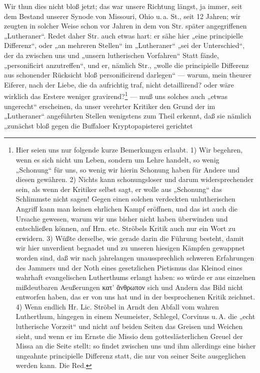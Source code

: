 Wir thun dies nicht bloß jetzt; das war unsere Richtung längst, ja immer, seit dem Bestand unserer
Synode von Missouri, Ohio u.\,a. St., seit 12 Jahren; wir zeugten in solcher Weise schon vor Jahren in dem
von Str. später angegriffenen „Lutheraner“. Redet daher Str. auch etwas hart: er sähe hier „eine
principielle Differenz“, oder „an mehreren Stellen“ im „Lutheraner“ „sei der Unterschied“,
der da zwischen uns und „unsern lutherischen Vorfahren“ Statt fände, „personificirt anzutreffen“,
und er, nämlich Str., „wolle die principielle Differenz aus schonender Rücksicht bloß personificirend
darlegen“ — warum, mein theurer Eiferer, nach der Liebe, die da aufrichtig traf, nicht detaillirend? oder
wäre wirklich das Erstere weniger gravirend?\footnote{Hier seien uns nur folgende kurze Bemerkungen erlaubt.
1) Wir begehren, wenn es sich nicht um Leben, sondern um Lehre handelt, so wenig „Schonung“ für uns,
so wenig wir hierin Schonung haben für Andere und diesen gewähren. 2) Nichts kann schonungsloser und
darum widersprechender sein, als wenn der Kritiker selbst sagt, er wolle aus „Schonung“ das Schlimmste
nicht sagen! Gegen einen solchen verdeckten unlutherischen Angriff kann man keinen ehrlichen Kampf
eröffnen, und das ist auch die Ursache gewesen, warum wir uns bisher nicht haben überwinden und
entschließen können, auf Hrn. etc. Ströbels Kritik auch nur ein Wort zu erwidern. 3) Wüßte derselbe, wie
gerade darin die Führung besteht, damit wir hier unverdient begnadet und zu unseren hiesigen Kämpfen
gewappnet worden sind, daß wir nach jahrelangen unaussprechlich schweren Erfahrungen des Jammers und
der Noth eines gesetzlichen Pietismus das Kleinod eines wahrhaft evangelischen Lutherthums erlangt haben:
so würde er aus einzelnen mißdeutbaren Aeußerungen κατ’ ἄνθρωπον sich und Andern das Bild nicht
entworfen haben, das er von uns hat und in der besprochenen Kritik zeichnet. 4) Wenn endlich Hr. Lic.
Ströbel in Arndt den Abfall vom wahren Lutherthum, hingegen in einem Neumeister, Schlegel, Corvinus u.\,A.
die „echt lutherische Vorzeit“ und nicht auf beiden Seiten das Greisen und Weichen sieht, und wenn er im
Ernste die Missio dem gotteslästerlichen Greuel der Missa an die Seite stellt: so findet zwischen uns und
ihm allerdings eine bisher ungeahnte principielle Differenz statt, die nur von seiner Seite ausgeglichen
werden kann. Die Red.} — muß uns solches auch „etwas ungerecht“ erscheinen,
da unser verehrter Kritiker den Grund der im „Lutheraner“ angeführten Stellen wenigstens zum
Theil erkennt, daß sie nämlich „zunächst bloß gegen die Buffaloer Kryptopapisterei gerichtet
